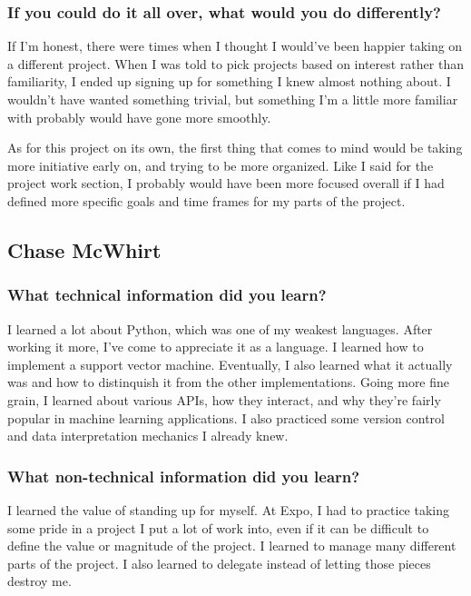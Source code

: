 \documentclass[10pt,journal,compsoc, draftclsnofoot,onecolumn]{IEEEtran}
\begin{document}
\subsubsection{If you could do it all over, what would you do differently?}

If I'm honest, there were times when I thought I would've been happier taking on a different project. 
When I was told to pick projects based on interest rather than familiarity, I ended up signing up for something I knew almost nothing about. 
I wouldn't have wanted something trivial, but something I'm a little more familiar with probably would have gone more smoothly.

As for this project on its own, the first thing that comes to mind would be taking more initiative early on, and trying to be more organized. 
Like I said for the project work section, I probably would have been more focused overall if I had defined more specific goals and time frames for my parts of the project. 


\subsection{Chase McWhirt}
\subsubsection{What technical information did you learn?}
I learned a lot about Python, which was one of my weakest languages.
After working it more, I've come to appreciate it as a language.
I learned how to implement a support vector machine.
Eventually, I also learned what it actually was and how to distinquish it from the other implementations.
Going more fine grain, I learned about various APIs, how they interact, and why they're fairly popular in machine learning applications.
I also practiced some version control and data interpretation mechanics I already knew.

\subsubsection{What non-technical information did you learn?}
I learned the value of standing up for myself.
At Expo, I had to practice taking some pride in a project I put a lot of work into, even if it can be difficult to define the value or magnitude of the project.
I learned to manage many different parts of the project.
I also learned to delegate instead of letting those pieces destroy me.
\end{document}
